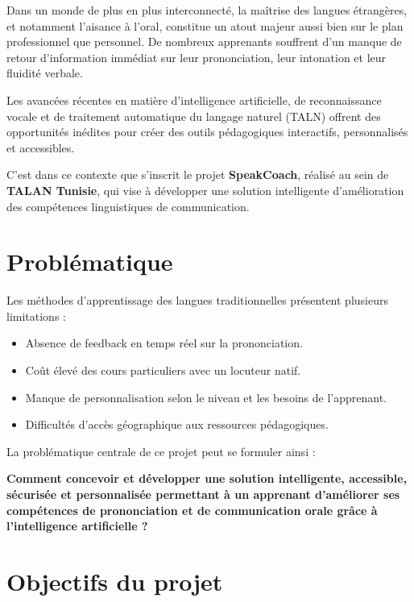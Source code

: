 \documentclass[12pt,a4paper]{report}
\begin{document}
Dans un monde de plus en plus interconnecté, la maîtrise des langues étrangères, et notamment l'aisance à l'oral, constitue un atout majeur aussi bien sur le plan professionnel que personnel. De nombreux apprenants souffrent d'un manque de retour d'information immédiat sur leur prononciation, leur intonation et leur fluidité verbale.

Les avancées récentes en matière d'intelligence artificielle, de reconnaissance vocale et de traitement automatique du langage naturel (TALN) offrent des opportunités inédites pour créer des outils pédagogiques interactifs, personnalisés et accessibles.

C'est dans ce contexte que s'inscrit le projet \textbf{SpeakCoach}, réalisé au sein de \textbf{TALAN Tunisie}, qui vise à développer une solution intelligente d'amélioration des compétences linguistiques de communication.

\section{Problématique}

Les méthodes d'apprentissage des langues traditionnelles présentent plusieurs limitations :

\begin{itemize}[leftmargin=2cm]
    \item Absence de feedback en temps réel sur la prononciation.
    \item Coût élevé des cours particuliers avec un locuteur natif.
    \item Manque de personnalisation selon le niveau et les besoins de l'apprenant.
    \item Difficultés d'accès géographique aux ressources pédagogiques.
\end{itemize}

La problématique centrale de ce projet peut se formuler ainsi :

\begin{infobox}
\textbf{Comment concevoir et développer une solution intelligente, accessible, sécurisée et personnalisée permettant à un apprenant d'améliorer ses compétences de prononciation et de communication orale grâce à l'intelligence artificielle ?}
\end{infobox}

\section{Objectifs du projet}
\end{document}
